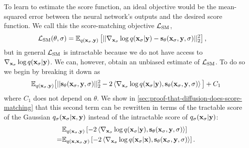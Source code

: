 
To learn to estimate the score function, an ideal objective would be the mean-squared error between the neural network's outputs and the desired score function. We call this the score-matching objective ${\mathcal{L}}_\text{SM}$,
\begin{align}
    \mathcal{L}_\text{SM}(\theta, \sigma) &= \mathbb{E}_{q({\mathbf{x}}_\sigma, {\mathbf{y}})} \left[ || \nabla_{{\mathbf{x}}_\sigma} \log q({\mathbf{x}}_\sigma|{\mathbf{y}}) - {\mathbf{s}}_\theta({\mathbf{x}}_\sigma, {\mathbf{y}}, \sigma) ||_2^2 \right],
\end{align}
but in general ${\mathcal{L}}_\text{SM}$ is intractable because we do not have access to $\nabla_{{\mathbf{x}}_\sigma} \log q({\mathbf{x}}_\sigma|{\mathbf{y}})$. We can, however, obtain an unbiased estimate of ${\mathcal{L}}_\text{SM}$. To do so we begin by breaking it down as
\begin{align}
    \mathbb{E}_{q({\mathbf{x}}_\sigma, {\mathbf{y}})} \big[ 
    || {\mathbf{s}}_\theta({\mathbf{x}}_\sigma, {\mathbf{y}}, \sigma) ||_2^2
    - 2 \left\langle \nabla_{{\mathbf{x}}_\sigma} \log q({\mathbf{x}}_\sigma|{\mathbf{y}}),
    {\mathbf{s}}_\theta({\mathbf{x}}_\sigma, {\mathbf{y}}, \sigma) \right\rangle \big]
    + C_1
\end{align}
where $C_1$ does not depend on $\theta$. We show in \cref{sec:proof-that-diffusion-does-score-matching} that this second term can be rewritten in terms of the tractable score of the Gaussian $q_{\sigma}({\mathbf{x}}_\sigma|{\mathbf{x}},{\mathbf{y}})$ instead of the intractable score of $q_{\sigma}({\mathbf{x}}_\sigma|{\mathbf{y}})$:
\begin{align}
\allowdisplaybreaks
    &\EX_{q(\rvx_\sigma, \rvy)} \left[ - 2 \left\langle \nabla_{\rvx_\sigma} \log q(\rvx_\sigma|\rvy), \rvs_\theta(\rvx_\sigma, \rvy, \sigma) \right\rangle \right] \\
    =& \EX_{q(\rvx, \rvx_\sigma, \rvy)} \left[ -2 \left\langle \nabla_{\rvx_\sigma} \log q(\rvx_\sigma|\rvx), \rvs_\theta(\rvx_\sigma, \rvy, \sigma) \right\rangle  \right].
\end{align}
